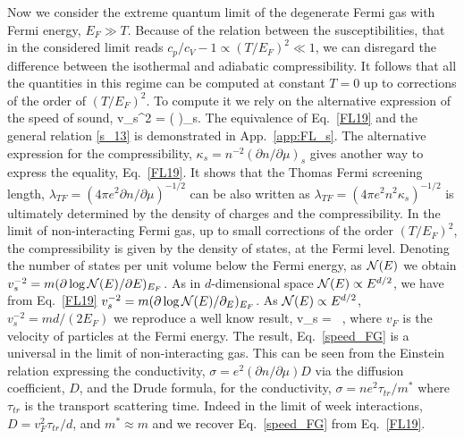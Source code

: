Now we consider the extreme quantum limit of the degenerate Fermi gas with Fermi energy, $E_F \gg T$.
Because of the relation between the susceptibilities, that in the considered limit reads $c_p/c_V - 1 \propto (T/E_F)^2 \ll 1$, \cite{ashcroft}
we can disregard the difference between the isothermal and adiabatic compressibility.
It follows that all the quantities in this regime can be computed at constant $T=0$ up to corrections of the order of $(T/E_F)^2$. 
To compute it we rely on the alternative expression of the speed of sound,
\be\label{FL19}
v_s^2 =  \left( \right)_s.
\ee
The equivalence of Eq.~\eqref{FL19} and the general relation \eqref{s_13} is demonstrated in App.~\ref{app:FL_s}.
The alternative expression for the compressibility, $\kappa_s = n^{-2} (\partial n / \partial \mu)_s$ gives another way to express the equality, Eq.~\eqref{FL19}.
It shows that the Thomas Fermi screening length, $\lambda_{TF} = (4 \pi e^2 \partial n / \partial \mu)^{-1/2} $ can be also written as
$\lambda_{TF} = (4 \pi e^2 n^2 \kappa_s)^{-1/2} $ is ultimately determined by the density of charges and the compressibility.
In the limit of non-interacting Fermi gas, up to small corrections of the order $(T/E_F)^2$, the compressibility is given by the density of states, %
at the Fermi level.
Denoting the number of states per unit volume below the Fermi energy, as ${\cal N}(E)$ we obtain 
$v_s^{-2} =m (\partial \log {\cal N}(E)/ \partial E)_{E_F}$.
As in $d$-dimensional space ${\cal N}(E) \propto E^{d/2}$, we have from Eq.~\eqref{FL19} $v_s^{-2} = m (\partial \log {\cal N}(E)/ \partial_E)_{E_F}$.
As ${\cal N}(E) \propto E^{d/2}$, $v_s^{-2} = m  d /(2 E_F)$ we reproduce a well know result, \cite{Pines1966}
\be\label{speed_FG}
v_s = \, ,
\ee
where $v_F$ is the velocity of particles at the Fermi energy.
The result, Eq.~\eqref{speed_FG} is a universal in the limit of non-interacting gas.
This can be seen from the Einstein relation expressing the conductivity, $\sigma = e^2 (\partial n /\partial \mu) D$ via the diffusion coefficient, $D$, and the Drude formula,
for the conductivity, $\sigma = n e^2 \tau_{tr}/m^*$ where $\tau_{tr}$ is the transport scattering time.
Indeed in the limit of week interactions, $D = v_F^2 \tau_{tr}/d$, and $m^* \approx m$ and we recover Eq.~\eqref{speed_FG} from Eq.~\eqref{FL19}.




